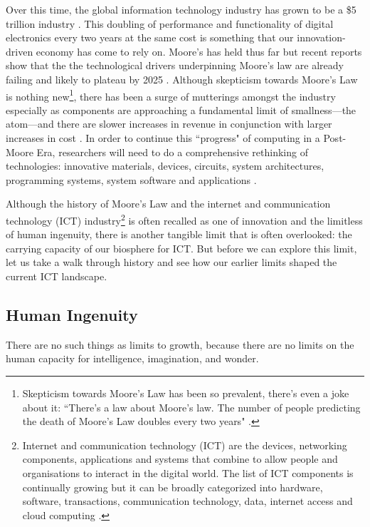 \documentclass{article}
\begin{document}
Over this time, the global information technology industry has grown to be a \$5 trillion industry \cite{comptia2021ITindustry}. This doubling of performance and functionality of digital electronics every two years at the same cost is something that our innovation-driven economy has come to rely on. Moore's has held thus far but recent reports show that the the technological drivers underpinning Moore's law are already failing and likely to plateau by 2025 \cite{IEEE2017postmoore}. Although skepticism towards Moore's Law is nothing new\footnote{Skepticism towards Moore's Law has been so prevalent, there's even a joke about it: ``There's a law about Moore's law. The number of people predicting the death of Moore's Law doubles every two years" \cite{economist2016aftermoores}.}, there has been a surge of mutterings amongst the industry especially as components are approaching a fundamental limit of smallness---the atom---and there are slower increases in revenue in conjunction with larger increases in cost \cite{economist2016aftermoores}. In order to continue this ``progress" of computing in a Post-Moore Era, researchers will need to do a comprehensive rethinking of technologies: innovative materials, devices, circuits, system architectures, programming systems, system software and applications \cite{IEEE2017postmoore}. 


Although the history of Moore's Law and the internet and communication technology (ICT) industry\footnote{Internet and communication technology (ICT) are the devices, networking components, applications and systems that combine to allow people and organisations to interact in the digital world. The list of ICT components is continually growing but it can be broadly categorized into hardware, software, transactions, communication technology, data, internet access and cloud computing \cite{techtarget2020ICT}.}
is often recalled as one of innovation and the limitless of human ingenuity, there is another tangible limit that is often overlooked: the carrying capacity of our biosphere for ICT. But before we can explore this limit, let us take a walk through history and see how our earlier limits shaped the current ICT landscape.


\cleardoublepage
\subsection{Human Ingenuity}
 \begin{fquote} 
 There are no such things as limits to growth, because there are no limits on the human capacity for intelligence, imagination, and wonder.
 \end{fquote}
\end{document}
